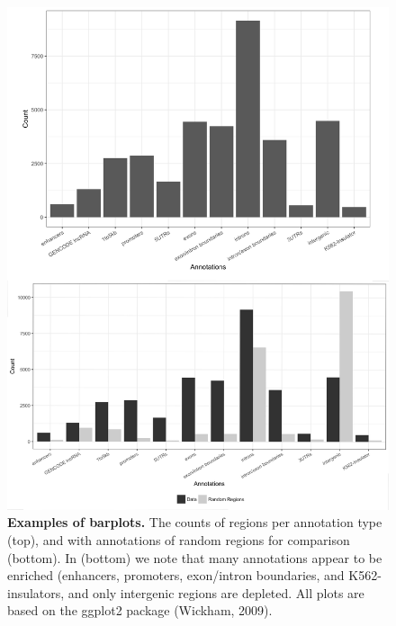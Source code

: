 \begin{figure}[ht!]
\centering
\includegraphics[width=1\textwidth]{chap4figs/figure4_2.pdf}
\caption[Examples of annotatr barplots.]
{
\textbf{Examples of barplots.} The counts of regions per annotation type (top), and with annotations of random regions for comparison (bottom). In (bottom) we note that many annotations appear to be enriched (enhancers, promoters, exon/intron boundaries, and K562-insulators, and only intergenic regions are depleted. All plots are based on the ggplot2 package (Wickham, 2009).
}
\label{chap4:fig:2}
\end{figure}

\newpage

